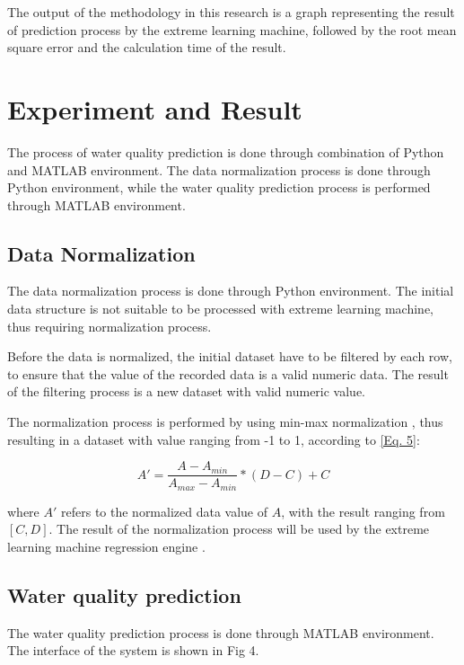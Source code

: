 \documentclass[journal,comsoc]{IEEEtran}
\begin{document}
The output of the methodology in this research is a graph representing the result of prediction process by the extreme learning machine, followed by the root mean square error and the calculation time of the result.

\section{Experiment and Result}

The process of water quality prediction is done through combination of Python and MATLAB environment. The data normalization process is done through Python environment, while the water quality prediction process is performed through MATLAB environment.

\subsection{Data Normalization}

The data normalization process is done through Python environment. The initial data structure is not suitable to be processed with extreme learning machine, thus requiring normalization process.

Before the data is normalized, the initial dataset have to be filtered by each row, to ensure that the value of the recorded data is a valid numeric data. The result of the filtering process is a new dataset with valid numeric value.

The normalization process is performed by using min-max normalization \cite{Patro15} , thus resulting in a dataset with value ranging from -1 to 1, according to \eqref{Eq. 5}:

\begin{equation}
A' = \frac{A - A_{min}}{A_{max} - A_{min}} * (D - C) + C\label{Eq. 5}
\end{equation}

where $A'$ refers to the normalized data value of $A$, with the result ranging from $[C, D]$. The result of the normalization process will be used by the extreme learning machine regression engine \cite{Zhu13}.

\subsection{Water quality prediction}

The water quality prediction process is done through MATLAB environment. The interface of the system is shown in Fig 4.
\end{document}
